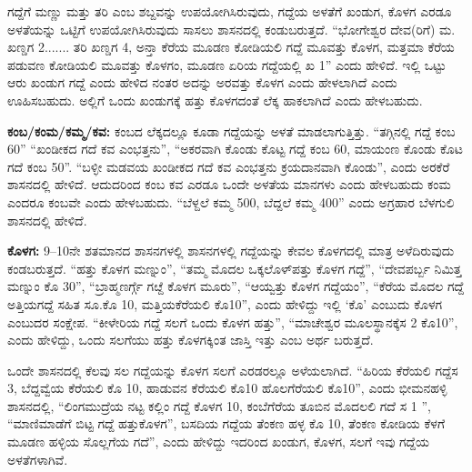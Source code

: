 \vskip 2pt

ಗದ್ದೆಗೆ ಮಣ್ಣು ಮತ್ತು ತರಿ ಎಂಬ ಶಬ್ದವನ್ನು ಉಪಯೋಗಿಸಿರುವುದು, ಗದ್ದೆಯ ಅಳತೆಗೆ ಖಂಡುಗ, ಕೊಳಗ ಎರಡೂ ಅಳತೆಯನ್ನು ಒಟ್ಟಿಗೆ ಉಪಯೋಗಿಸಿರುವುದು ಸಾಸಲು ಶಾಸನದಲ್ಲಿ ಕಂಡುಬರುತ್ತದೆ. “ಭೋಗೇಶ್ವರ ದೇವ(ರಿಗೆ) ಮ. ಖಣ್ಡಗ 2....... ತರಿ ಖಣ್ಡಗ 4, ಅನ್ತಾ ಕೆರೆಯ ಮೂಡಣ ಕೋಡಿಯಲಿ ಗದ್ದೆ ಮೂವತ್ತು ಕೊಳಗ, ಮತ್ತಮಾ ಕೆರೆಯ ಪಡುವಣ ಕೋಡಿಯಲಿ ಮೂವತ್ತು ಕೊಳಗಂ, ಮೂಡಣ ಏರಿಯ ಗದ್ದೆಯಲ್ಲಿ ಖ 1” ಎಂದು ಹೇಳಿದೆ. ಇಲ್ಲಿ ಒಟ್ಟು ಆರು ಖಂಡುಗ ಗದ್ದೆ ಎಂದು ಹೇಳಿದ ನಂತರ ಅದನ್ನು ಅರವತ್ತು ಕೊಳಗ ಎಂದು ಹೇಳಲಾಗಿದೆ ಎಂದು ಊಹಿಸಬಹುದು. ಅಲ್ಲಿಗೆ ಒಂದು ಖಂಡುಗಕ್ಕೆ ಹತ್ತು ಕೊಳಗದಂತೆ ಲೆಕ್ಕ ಹಾಕಲಾಗಿದೆ ಎಂದು ಹೇಳಬಹುದು.

\vskip 2pt

\textbf{ಕಂಬ/ಕಂಮ/ಕಮ್ಮ/ಕವ:} ಕಂಬದ ಲೆಕ್ಕದಲ್ಲೂ ಕೂಡಾ ಗದ್ದೆಯನ್ನು ಅಳತೆ ಮಾಡಲಾಗುತ್ತಿತ್ತು. “ತಗ್ಗಿನಲ್ಲಿ ಗದ್ದೆ ಕಂಬ 60” “ಖಂಡೀಕದ ಗದೆ ಕವ ಎಂಭತ್ತನು”, “ಅಕರವಾಗಿ ಕೊಂಡು ಕೊಟ್ಟ ಗದ್ದೆ ಕಂಬ 60, ಮಾಯಂಣ ಕೊಂಡು ಕೊಟ ಗದೆ ಕಂಬ 50”. “ಬಳ್ಳೀ ಮಡವಯ ಖಂಡೀಕದ ಗದೆ ಕವ ಎಂಭತ್ತನು ಕ್ರಯದಾನವಾಗಿ ಕೊಂಡು”, ಎಂದು ಅರಕೆರೆ ಶಾಸನದಲ್ಲಿ ಹೇಳಿದೆ. ಆದುದರಿಂದ ಕಂಬ ಕವ ಎರಡೂ ಒಂದೇ ಅಳತೆಯ ಮಾನಗಳು ಎಂದು ಹೇಳಬಹುದು ಕಂಮ ಎಂದರೂ ಕಂಬವೇ ಎಂದು ಹೇಳಬಹುದು. “ಬೆಳ್ದಲೆ ಕಮ್ಮ 500, ಬೆದ್ದಲೆ ಕಮ್ಮ 400” ಎಂದು ಅಗ್ರಹಾರ ಬೆಳಗುಲಿ ಶಾಸನದಲ್ಲಿ ಹೇಳಿದೆ.

\textbf{ಕೊಳಗ:} 9–10ನೇ ಶತಮಾನದ ಶಾಸನಗಳಲ್ಲಿ ಶಾಸನಗಳಲ್ಲಿ ಗದ್ದೆಯನ್ನು ಕೇವಲ ಕೊಳಗದಲ್ಲಿ ಮಾತ್ರ ಅಳೆದಿರುವುದು ಕಂಡಬರುತ್ತದೆ. “ಹತ್ತು ಕೊಳಗ ಮಣ್ನುಂ”, “ತಮ್ಮ ಮೊದಲ ಒಕ್ಕಲೊಳ್​ ಪತ್ತು ಕೊಳಗ ಗದ್ದೆ”, “ದೇವ\-ಪರ್ಬ್ಬ ನಿಮಿತ್ತ ಮಣ್ನುಂ ಕೊ 30”, “ಬ್ರಾಹ್ಮಣರ್ಗ್ಗೆ ಗೞ್ದೆ ಕೊಳಗ ಮೂರು”, “ಆಯ್ವತ್ತು ಕೊಳಗ ಗದ್ದೆಯಂ”, “ಕೆರೆಯ ಮೊದಲ ಗದ್ದೆ ಅತ್ತಿಯಗದ್ದೆ ಸಹಿತ ಸೂ.ಕೊ 10, ಮತ್ತಿಯಕೆರೆಯಲಿ ಕೊ10”, ಎಂದು ಹೇಳಿದ್ದು ಇಲ್ಲಿ ‘ಕೊ’ ಎಂಬುದು ಕೊಳಗ ಎಂಬುದರ ಸಂಕ್ಷೇಪ. “ಕೀಳೇರಿಯ ಗದ್ದೆ ಸಲಗೆ ಒಂದು ಕೊಳಗ ಹತ್ತು”, “ಮಾಚೇಶ್ವರ ಮೂಲಸ್ಥಾನಕ್ಕೆ\break ಸ 2 ಕೊ10”, ಎಂದು ಹೇಳಿದ್ದು, ಒಂದು ಸಲಗೆಯು ಹತ್ತು ಕೊಳಗಕ್ಕಿಂತ ಜಾಸ್ತಿ ಇತ್ತು ಎಂಬ ಅರ್ಥ ಬರುತ್ತದೆ.

ಒಂದೇ ಶಾಸನದಲ್ಲಿ ಕೆಲವು ಸಲ ಗದ್ದೆಯನ್ನು ಕೊಳಗ ಸಲಗೆ ಎರಡರಲ್ಲೂ ಅಳೆಯಲಾಗಿದೆ. “ಹಿರಿಯ ಕೆರೆಯಲಿ ಗದ್ದೆ\break ಸ 3, ಬೆದ್ದವ್ವೆಯ ಕೆರೆಯಲಿ ಕೊ 10, ಹಾಡುವನ ಕೆರೆಯಲಿ ಕೊ10 ಹೊಲಗೆರೆಯಲಿ ಕೊ10”, ಎಂದು ಭೀಮನಹಳ್ಳಿ ಶಾಸನದಲ್ಲಿ, “ಲಿಂಗಮುದ್ರೆಯ ನಟ್ಟ ಕಲ್ಲಿಂ ಗದ್ದೆ ಕೊಳಗ 10, ಕಂಬೆಗೆರೆಯ ತೂಬಿನ ಮೊದಲಲಿ ಗದೆ ಸ 1 ”, “ಮಾಣಿಮಾಡೆಗೆ ಬಿಟ್ಟ ಗದ್ದೆ ಹತ್ತುಕೊಳಗ”, ಬಸದಿಯ ಗದ್ದೆಯ ತೆಂಕಣ ಹಳ್ಳ ಕೊ 10, ತೆಂಕಣ ಕೋಡಿಯ ಕೆಳಗೆ ಮೂಡಣ ಹಳ್ಳಿಯ ಸೊಲ್ಲಗೆಯ ಗದೆ”, ಎಂದು ಹೇಳಿದ್ದು ಇದರಿಂದ ಖಂಡುಗ, ಕೊಳಗ, ಸಲಗೆ ಇವು ಗದ್ದೆಯ ಅಳತೆಗಳಾಗಿವೆ.

